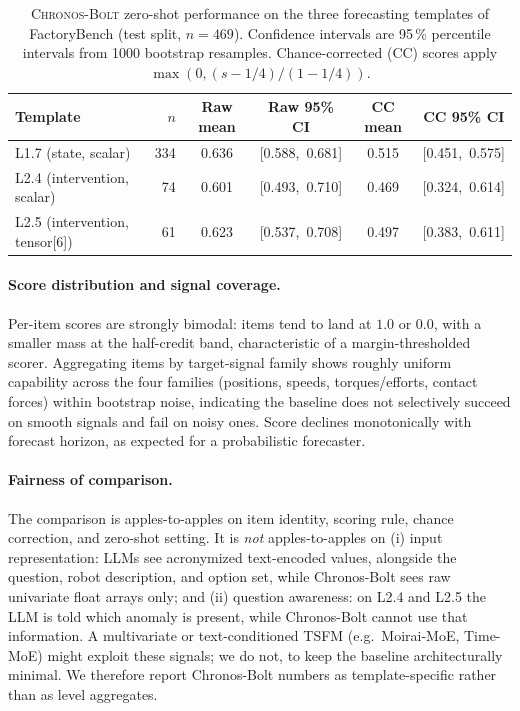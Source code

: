 \documentclass{article}
\begin{document}
\begin{table}[htbp]
    \centering
    \caption{\textsc{Chronos-Bolt} zero-shot performance on the three forecasting templates of FactoryBench (test split, $n=469$). Confidence intervals are 95\,\% percentile intervals from 1000 bootstrap resamples. Chance-corrected (CC) scores apply $\max(0,(s-1/4)/(1-1/4))$.}
    \label{tab:chronos-results}
    \small
    \begin{tabular}{@{}lr cc cc@{}}
        \toprule
        Template                       & $n$ & Raw mean & Raw 95\% CI     & CC mean & CC 95\% CI      \\
        \midrule
        L1.7 (state, scalar)           & 334 & 0.636    & [0.588,\ 0.681] & 0.515   & [0.451,\ 0.575] \\
        L2.4 (intervention, scalar)    & 74  & 0.601    & [0.493,\ 0.710] & 0.469   & [0.324,\ 0.614] \\
        L2.5 (intervention, tensor[6]) & 61  & 0.623    & [0.537,\ 0.708] & 0.497   & [0.383,\ 0.611] \\
        \bottomrule
    \end{tabular}
\end{table}

\paragraph{Score distribution and signal coverage.} Per-item scores are strongly bimodal: items tend to land at $1.0$ or $0.0$, with a smaller mass at the half-credit band, characteristic of a margin-thresholded scorer. Aggregating items by target-signal family shows roughly uniform capability across the four families (positions, speeds, torques/efforts, contact forces) within bootstrap noise, indicating the baseline does not selectively succeed on smooth signals and fail on noisy ones. Score declines monotonically with forecast horizon, as expected for a probabilistic forecaster.

\paragraph{Fairness of comparison.} The comparison is apples-to-apples on item identity, scoring rule, chance correction, and zero-shot setting. It is \emph{not} apples-to-apples on (i) input representation: LLMs see acronymized text-encoded values, alongside the question, robot description, and option set, while Chronos-Bolt sees raw univariate float arrays only; and (ii) question awareness: on L2.4 and L2.5 the LLM is told which anomaly is present, while Chronos-Bolt cannot use that information. A multivariate or text-conditioned TSFM (e.g.\ Moirai-MoE, Time-MoE) might exploit these signals; we do not, to keep the baseline architecturally minimal. We therefore report Chronos-Bolt numbers as template-specific rather than as level aggregates.
\end{document}
